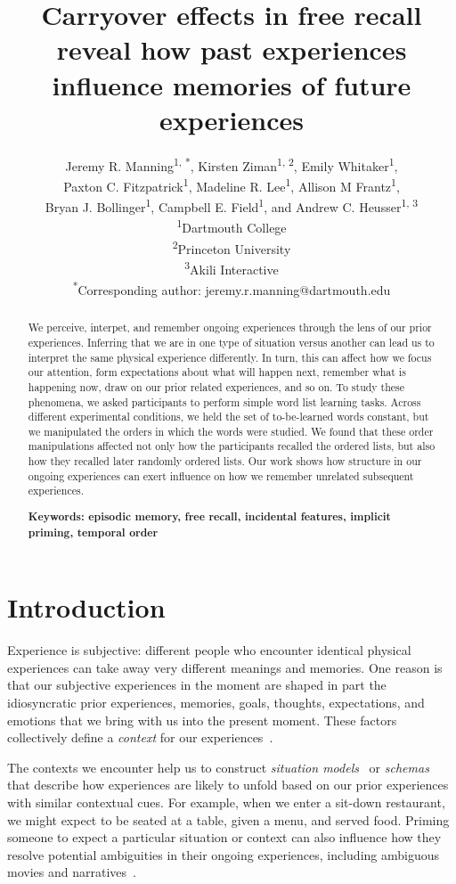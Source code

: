 \documentclass[11pt]{article}
\title{\Large Carryover effects in free recall reveal how past experiences influence
memories of future experiences}
\author{Jeremy R. Manning\textsuperscript{1, *}, Kirsten
Ziman\textsuperscript{1, 2}, Emily Whitaker\textsuperscript{1},\\Paxton C.
Fitzpatrick\textsuperscript{1}, Madeline R. Lee\textsuperscript{1}, Allison M
Frantz\textsuperscript{1},\\Bryan J. Bollinger\textsuperscript{1}, Campbell E.
Field\textsuperscript{1}, and Andrew C. Heusser\textsuperscript{1,
3}\\\textsuperscript{1}Dartmouth College\\\textsuperscript{2}Princeton
University\\\textsuperscript{3}Akili
Interactive\\\textsuperscript{*}Corresponding author:
jeremy.r.manning@dartmouth.edu}
\date{}
\begin{document}
\maketitle

\begin{abstract} \footnotesize{We perceive, interpet, and remember ongoing experiences
through the lens of our prior experiences. Inferring that we are in one type of
situation versus another can lead us to interpret the same physical experience
differently. In turn, this can affect how we focus our attention, form
expectations about what will happen next, remember what is happening now, draw on
our prior related experiences, and so on. To study these phenomena, we asked
participants to perform simple word list learning tasks. Across different
experimental conditions, we held the set of to-be-learned words constant, but
we manipulated the orders in which the words were studied. We found that these
order manipulations affected not only how the participants recalled the ordered
lists, but also how they recalled later randomly ordered lists. Our work shows
how structure in our ongoing experiences can exert influence on how we remember
unrelated subsequent experiences. 

\textbf{Keywords: episodic memory, free recall, incidental features, implicit priming, temporal order}}

\end{abstract}


\section*{Introduction}


Experience is subjective: different people who encounter identical physical
experiences can take away very different meanings and memories. One reason is
that our subjective experiences in the moment are shaped in part the
idiosyncratic prior experiences, memories, goals, thoughts, expectations, and
emotions that we bring with us into the present moment. These factors
collectively define a \textit{context} for our experiences~\citep{Mann20}. 


The contexts we encounter help us to construct \textit{situation
models}~\citep{RangRitc12, MannEtal15} or \textit{schemas}~\citep{MasiEtal22,
BaldEtal18} that describe how experiences are likely to unfold based on our
prior experiences with similar contextual cues. For example, when we enter a
sit-down restaurant, we might expect to be seated at a table, given a menu, and
served food. Priming someone to expect a particular situation or context can
also influence how they resolve potential ambiguities in their ongoing
experiences, including ambiguous movies and narratives~\citep{YeshEtal17}.
\end{document}
